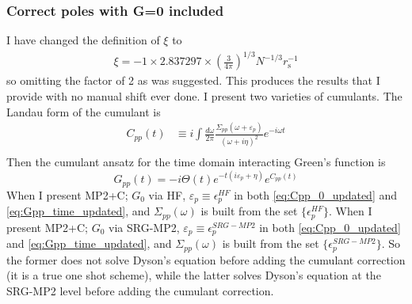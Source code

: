 \subsubsection{Correct poles with G=0 included}
I have changed the definition of $\xi$ to
\begin{align}
    \xi = -1 \times 2.837297 \times\left(\frac{3}{4 \pi}\right)^{1 / 3} N^{-1 / 3} r_{\mathrm{s}}^{-1}
\end{align}
so omitting the factor of 2 as was suggested. This produces the results that I provide with no manual shift ever done. I present two varieties of cumulants. The Landau form of the cumulant is
\begin{align}
    C_{pp}(t) &\equiv i \int \frac{d\omega}{2\pi} \frac{ \Sigma_{pp}\left(\omega+\varepsilon_p\right)}{(\omega + i \eta)^2} e^{-i \omega t}
\label{eq:Cpp_0_updated} \\
\end{align}
Then the cumulant ansatz for the time domain interacting Green's function is
\begin{equation}
    G_{pp}(t) = -i \Theta(t) e^{-t(i \varepsilon_p +\eta)} e^{C_{pp}(t)}
\label{eq:Gpp_time_updated}
\end{equation}
When I present MP2+C; $G_0$ via HF, $\varepsilon _p\equiv \epsilon_p^{HF}$ in both \ref{eq:Cpp_0_updated} and \ref{eq:Gpp_time_updated}, and $\Sigma _{pp}(\omega)$ is built from the set $\{\epsilon_p^{HF}\}$. When I present MP2+C; $G_0$ via SRG-MP2, $\varepsilon _p\equiv \epsilon_p^{SRG-MP2}$ in both \ref{eq:Cpp_0_updated} and \ref{eq:Gpp_time_updated}, and $\Sigma _{pp}(\omega)$ is built from the set $\{\epsilon_p^{SRG-MP2}\}$. So the former does not solve Dyson's equation before adding the cumulant correction (it is a true one shot scheme), while the latter solves Dyson's equation at the SRG-MP2 level before adding the cumulant correction.

